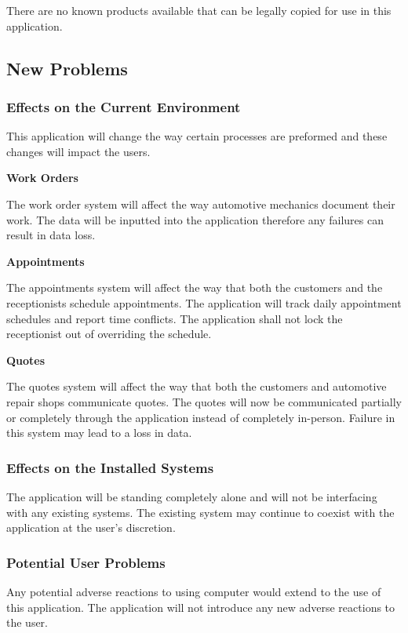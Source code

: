 \documentclass[12pt]{article}
\begin{document}
There are no known products available that can be legally copied for use in this application.

\subsection{New Problems}

\subsubsection{Effects on the Current Environment}

This application will change the way certain processes are preformed and these changes will impact
the users.

\textbf{Work Orders}

The work order system will affect the way automotive mechanics document their work. The data will
be inputted into the application therefore any failures can result in data loss.

\textbf{Appointments}

The appointments system will affect the way that both the customers and the receptionists schedule
appointments. The application will track daily appointment schedules and report time conflicts. The
application shall not lock the receptionist out of overriding the schedule.

\textbf{Quotes}

The quotes system will affect the way that both the customers and automotive repair shops
communicate quotes. The quotes will now be communicated partially or completely through the
application instead of completely in-person. Failure in this system may lead to a loss in data.

\subsubsection{Effects on the Installed Systems}

The application will be standing completely alone and will not be interfacing with any existing
systems. The existing system may continue to coexist with the application at the user's discretion.

\subsubsection{Potential User Problems}

Any potential adverse reactions to using computer would extend to the use of this application. The
application will not introduce any new adverse reactions to the user.
\end{document}
